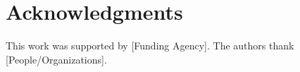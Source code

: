 \documentclass[conference]{IEEEtran}
\begin{document}










\section*{Acknowledgments}
This work was supported by [Funding Agency]. The authors thank [People/Organizations].



\end{document}
